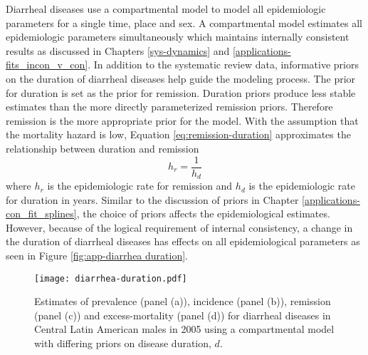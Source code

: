 Diarrheal diseases use a compartmental model to model all
epidemiologic parameters for a single time, place and sex.  A
compartmental model estimates all epidemiologic parameters
simultaneously which maintains internally consistent results as
discussed in Chapters \ref{sys-dynamics} and
\ref{applications-fits_incon_v_con}.  In addition to the systematic
review data, informative priors on the duration of diarrheal diseases
help guide the modeling process.  The prior for duration is set as the
prior for remission.  Duration priors produce less stable estimates
than the more directly parameterized remission priors.  Therefore
remission is the more appropriate prior for the model.  With the
assumption that the mortality hazard is low, Equation
\ref{eq:remission-duration} approximates the relationship between
duration and remission
    \begin{equation} \label{eq:remission-duration}
    	h_{r} = \frac{1}{h_{d}}
    \end{equation}
where $h_{r}$ is the epidemiologic rate for remission and $h_{d}$ is
the epidemiologic rate for duration in years.  Similar to the
discussion of priors in Chapter \ref{applications-con_fit_splines},
the choice of priors affects the epidemiological estimates.  However,
because of the logical requirement of internal consistency, a change
in the duration of diarrheal diseases has effects on all
epidemiological parameters as seen in Figure \ref{fig:app-diarrhea
  duration}.

    \begin{figure}[h]
        \begin{center}
            \texttt{[image: diarrhea-duration.pdf]}
            \caption{Estimates of prevalence (panel (a)), incidence
              (panel (b)), remission (panel (c)) and excess-mortality
              (panel (d)) for diarrheal diseases in Central Latin
              American males in 2005 using a compartmental model with
              differing priors on disease duration, $d$.}
            \label{fig:app-diarrhea duration}
        \end{center}
    \end{figure}
